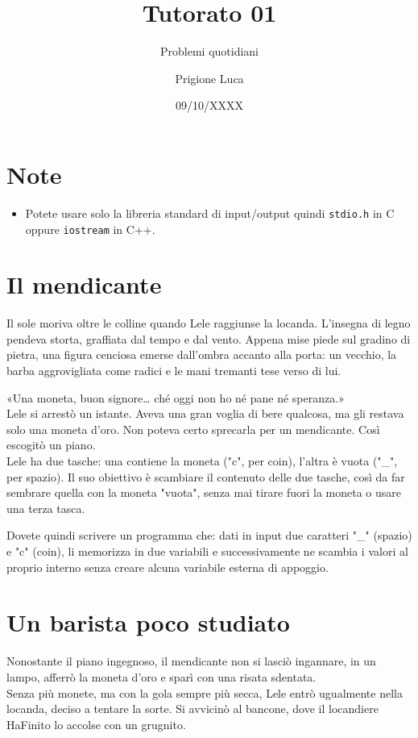 \documentclass[a4paper]{article}
\title{Tutorato 01}
\subtitle{Problemi quotidiani}
\author{Prigione Luca}
\date{09/10/XXXX}
\begin{document}
\pagestyle{empty}

\maketitle

\section*{Note}
    \begin{itemize}
        \item Potete usare solo la libreria standard di input/output quindi \texttt{stdio.h} in C oppure \texttt{iostream} in C++.
    \end{itemize}

\section*{Il mendicante}
Il sole moriva oltre le colline quando Lele raggiunse la locanda. L'insegna di legno pendeva storta, graffiata dal tempo e dal vento.
Appena mise piede sul gradino di pietra, una figura cenciosa emerse dall’ombra accanto alla porta: un vecchio, la barba aggrovigliata come radici e le mani tremanti tese verso di lui.

«Una moneta, buon signore… ché oggi non ho né pane né speranza.»\\
Lele si arrestò un istante. Aveva una gran voglia di bere qualcosa, ma gli restava solo una moneta d’oro. Non poteva certo sprecarla per un mendicante.
Così escogitò un piano.\\
Lele ha due tasche: una contiene la moneta ("c", per coin), l’altra è vuota ("\_", per spazio). Il suo obiettivo è scambiare il contenuto delle due tasche, così da far sembrare quella con la moneta "vuota", senza mai tirare fuori la moneta o usare una terza tasca.

Dovete quindi scrivere un programma che: dati in input due caratteri "\_" (spazio) e "c" (coin), li memorizza in due variabili e successivamente ne scambia i valori al proprio interno senza creare alcuna variabile esterna di appoggio.

\section*{Un barista poco studiato}
Nonostante il piano ingegnoso, il mendicante non si lasciò ingannare, in un lampo, afferrò la moneta d’oro e sparì con una risata sdentata.\\
Senza più monete, ma con la gola sempre più secca, Lele entrò ugualmente nella locanda, deciso a tentare la sorte.
Si avvicinò al bancone, dove il locandiere HaFinito lo accolse con un grugnito.
\end{document}
